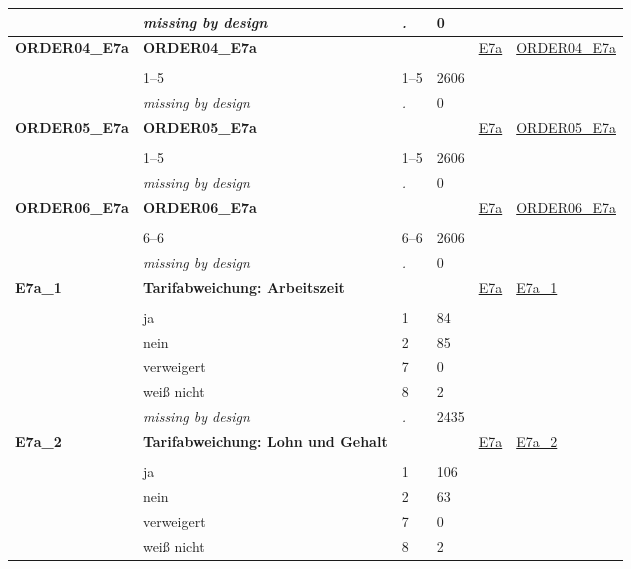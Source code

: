 \begin{longtable}{| L{2.45cm} | L{6cm} | C{1.5cm} | R{1cm} | C{2.25cm} | C{2.25cm} |}
   & \textit{missing by design} & \textit{.} & 0 &  &  \\ 
   \midrule
\textbf{ORDER04\_E7a}\label{var:ORDER04:E7a} & \textbf{ORDER04\_E7a} &  &  & \hyperref[E7a]{E7a} & \hyperref[var:suf:ORDER04:E7a]{ORDER04\_E7a} \\ 
   &  &  &  &  &  \\ 
   & 1--5 & 1--5 & 2606 &  &  \\ 
   & \textit{missing by design} & \textit{.} & 0 &  &  \\ 
   \midrule
\textbf{ORDER05\_E7a}\label{var:ORDER05:E7a} & \textbf{ORDER05\_E7a} &  &  & \hyperref[E7a]{E7a} & \hyperref[var:suf:ORDER05:E7a]{ORDER05\_E7a} \\ 
   &  &  &  &  &  \\ 
   & 1--5 & 1--5 & 2606 &  &  \\ 
   & \textit{missing by design} & \textit{.} & 0 &  &  \\ 
   \midrule
\textbf{ORDER06\_E7a}\label{var:ORDER06:E7a} & \textbf{ORDER06\_E7a} &  &  & \hyperref[E7a]{E7a} & \hyperref[var:suf:ORDER06:E7a]{ORDER06\_E7a} \\ 
   &  &  &  &  &  \\ 
   & 6--6 & 6--6 & 2606 &  &  \\ 
   & \textit{missing by design} & \textit{.} & 0 &  &  \\ 
   \midrule
\textbf{E7a\_1}\label{var:E7a:1} & \textbf{Tarifabweichung: Arbeitszeit} &  &  & \hyperref[E7a]{E7a} & \hyperref[var:suf:E7a:1]{E7a\_1} \\ 
   &  &  &  &  &  \\ 
   & ja & 1 & 84 &  &  \\ 
   & nein & 2 & 85 &  &  \\ 
   & verweigert & 7 & 0 &  &  \\ 
   & weiß nicht & 8 & 2 &  &  \\ 
   & \textit{missing by design} & \textit{.} & 2435 &  &  \\ 
   \midrule
\textbf{E7a\_2}\label{var:E7a:2} & \textbf{Tarifabweichung: Lohn und Gehalt} &  &  & \hyperref[E7a]{E7a} & \hyperref[var:suf:E7a:2]{E7a\_2} \\ 
   &  &  &  &  &  \\ 
   & ja & 1 & 106 &  &  \\ 
   & nein & 2 & 63 &  &  \\ 
   & verweigert & 7 & 0 &  &  \\ 
   & weiß nicht & 8 & 2 &  &  \\ 

\end{longtable}
